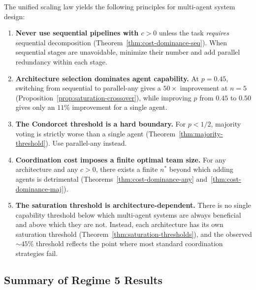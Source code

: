 \begin{corollary}
\label{cor:design}
The unified scaling law yields the following principles for multi-agent system design:
\begin{enumerate}
  \item \textbf{Never use sequential pipelines with $c > 0$} unless the task
    \emph{requires} sequential decomposition (Theorem~\ref{thm:cost-dominance-seq}).
    When sequential stages are unavoidable, minimize their number and add parallel
    redundancy within each stage.

  \item \textbf{Architecture selection dominates agent capability.} At $p = 0.45$,
    switching from sequential to parallel-any gives a $50\times$ improvement at
    $n = 5$ (Proposition~\ref{prop:saturation-crossover}), while improving $p$
    from $0.45$ to $0.50$ gives only an $11\%$ improvement for a single agent.

  \item \textbf{The Condorcet threshold is a hard boundary.} For $p < 1/2$,
    majority voting is strictly worse than a single agent
    (Theorem~\ref{thm:majority-threshold}). Use parallel-any instead.

  \item \textbf{Coordination cost imposes a finite optimal team size.} For any
    architecture and any $c > 0$, there exists a finite $n^*$ beyond which adding
    agents is detrimental (Theorems~\ref{thm:cost-dominance-any}
    and~\ref{thm:cost-dominance-maj}).

  \item \textbf{The saturation threshold is architecture-dependent.} There is no
    single capability threshold below which multi-agent systems are always
    beneficial and above which they are not. Instead, each architecture has its
    own saturation threshold (Theorem~\ref{thm:saturation-thresholds}), and the
    observed $\sim 45\%$ threshold reflects the point where most standard
    coordination strategies fail.
\end{enumerate}
\end{corollary}

\subsection{Summary of Regime 5 Results}
\label{subsec:regime5-summary}

